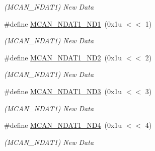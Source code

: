 \begin{DoxyCompactItemize}
\begin{DoxyCompactList}\small\item\em (M\+C\+A\+N\+\_\+\+N\+D\+A\+T1) New Data \end{DoxyCompactList}\item 
\mbox{\label{group__SAME70__MCAN_gaa83c7bb353d636988a68f3f5809e96fa}} 
\#define \mbox{\hyperlink{group__SAME70__MCAN_gaa83c7bb353d636988a68f3f5809e96fa}{M\+C\+A\+N\+\_\+\+N\+D\+A\+T1\+\_\+\+N\+D1}}~(0x1u $<$$<$ 1)
\begin{DoxyCompactList}\small\item\em (M\+C\+A\+N\+\_\+\+N\+D\+A\+T1) New Data \end{DoxyCompactList}\item 
\mbox{\label{group__SAME70__MCAN_gaebaa1cee4b534bff06778d4c847e50d3}} 
\#define \mbox{\hyperlink{group__SAME70__MCAN_gaebaa1cee4b534bff06778d4c847e50d3}{M\+C\+A\+N\+\_\+\+N\+D\+A\+T1\+\_\+\+N\+D2}}~(0x1u $<$$<$ 2)
\begin{DoxyCompactList}\small\item\em (M\+C\+A\+N\+\_\+\+N\+D\+A\+T1) New Data \end{DoxyCompactList}\item 
\mbox{\label{group__SAME70__MCAN_gab712b46dc1fdc6f634782f3aa001b9ab}} 
\#define \mbox{\hyperlink{group__SAME70__MCAN_gab712b46dc1fdc6f634782f3aa001b9ab}{M\+C\+A\+N\+\_\+\+N\+D\+A\+T1\+\_\+\+N\+D3}}~(0x1u $<$$<$ 3)
\begin{DoxyCompactList}\small\item\em (M\+C\+A\+N\+\_\+\+N\+D\+A\+T1) New Data \end{DoxyCompactList}\item 
\mbox{\label{group__SAME70__MCAN_ga3b9d96d794c579d95f36462f469d2339}} 
\#define \mbox{\hyperlink{group__SAME70__MCAN_ga3b9d96d794c579d95f36462f469d2339}{M\+C\+A\+N\+\_\+\+N\+D\+A\+T1\+\_\+\+N\+D4}}~(0x1u $<$$<$ 4)
\begin{DoxyCompactList}\small\item\em (M\+C\+A\+N\+\_\+\+N\+D\+A\+T1) New Data \end{DoxyCompactList}\item 
\mbox{\label{group__SAME70__MCAN_ga73d7da4f83ad1a65335fc27462d41521}} 

\end{DoxyCompactItemize}

